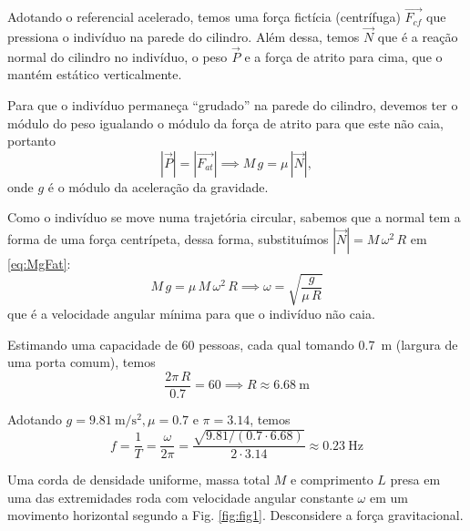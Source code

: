 \documentclass[]{IMTexam}
\begin{document}
\begin{questions}
\begin{solution}
\begin{multi}
			\nextcol

			Adotando o referencial acelerado, temos uma força fictícia (centrífuga) $ \vec{F_{cf}} $ que pressiona o indivíduo na parede do cilindro. Além dessa, temos $\vec{N}$ que é a reação normal do cilindro no indivíduo, o peso $ \vec{P} $ e a força de atrito para cima, que o mantém estático verticalmente.

			Para que o indivíduo permaneça ``grudado'' na parede do cilindro, devemos ter o módulo do peso igualando o módulo da força de atrito para que este não caia, portanto
			\begin{equation}\label{eq:MgFat}
				|\vec{P}|=|\vec{F_{at}}|\implies M\,g=\mu\,|\vec{N}|,
			\end{equation}
			onde $ g $ é o módulo da aceleração da gravidade.

			Como o indivíduo se move numa trajetória circular, sabemos que a normal tem a forma de uma força centrípeta, dessa forma, substituímos $ |\vec{N}|=M\,\omega^{2}\,R $ em \ref{eq:MgFat}:
			\begin{equation}\label{eq:omegaMin}
				M\,g=\mu\,M\,\omega^{2}\,R\implies \omega = \sqrt{\dfrac{g}{\mu\,R}}
			\end{equation}
			que é a velocidade angular mínima para que o indivíduo não caia.

		\end{multi}

		\begin{unindent}
			\item Estimando uma capacidade de 60 pessoas, cada qual tomando \SI{0.7}{\meter} (largura de uma porta comum), temos
			\[ \dfrac{2\pi\,R}{\num{0.7}}=60\implies R\approx \SI{6.68}{\meter} \]

			Adotando $ g=\SI{9.81}{\meter\per\second\squared}, \mu=\num{0.7} $ e $ \pi=\num{3.14} $, temos
			\[ f=\dfrac{1}{T}=\dfrac{\omega}{2\pi}=\dfrac{\sqrt{\num{9.81}/(\num{0.7}\cdot\num{6.68})}}{2\cdot\num{3.14}}\approx \SI{0.23}{\hertz}  \]
		\end{unindent}

	\end{solution}



	\question Uma corda de densidade uniforme, massa total $ M $ e comprimento $ L $ presa em uma das extremidades roda com velocidade angular constante $ \omega $ em um movimento horizontal segundo a Fig. \ref{fig:fig1}. Desconsidere a força gravitacional.


\end{questions}
\end{document}
